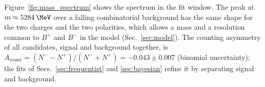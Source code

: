 Figure~\ref{fig:mass_spectrum} shows the spectrum in the fit window. The peak at $m\approx5284\,\MeV$ over a falling combinatorial background has the same shape for the two charges and the two polarities, which allows a mass and a resolution common to $B^+$ and $B^-$ in the model (Sec.~\ref{sec:model}). The counting asymmetry of all candidates, signal and background together, is $A_{\mathrm{count}}=(N^--N^+)/(N^-+N^+)=-0.043\pm0.007$ (binomial uncertainty); the fits of Secs.~\ref{sec:frequentist} and \ref{sec:bayesian} refine it by separating signal and background.
